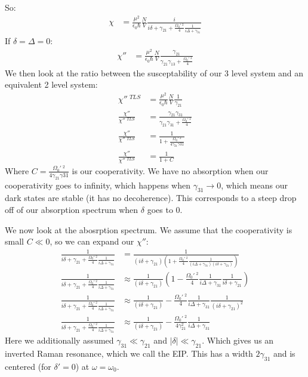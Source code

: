 So:
\begin{align*}
	\chi &= \frac{\mu^2}{\epsilon_0\hbar} \frac{N}{V} \frac{i}{i\delta + \gamma_{21} + \frac{\Omega_0'\ ^2}{4}\frac{1}{i\Delta + \gamma_{31}}}
\end{align*}
If $\delta = \Delta = 0$:
\begin{align*}
	\chi'' &= \frac{\mu^2}{\epsilon_0 \hbar} \frac{N}{V} \frac{\gamma_{21}}{\gamma_{21}\gamma_{13} + \frac{\Omega_0'\ ^2}{4}}
\end{align*}
We then look at the ratio between the susceptability of our 3 level system and an equivalent 2 level system:
\begin{align*}
	\chi''\ ^{TLS} &= \frac{\mu^2}{\epsilon_0\hbar} \frac{N}{V} \frac{1}{\gamma_{21}} \\
	\frac{\chi''}{\chi''\ ^{TLS}} &= \frac{\gamma_{21}\gamma_{31}}{\gamma_{21}\gamma_{31} + \frac{\Omega_0'\ ^2}{4}} \\
	\frac{\chi''}{\chi''\ ^{TLS}} &= \frac{1}{1 + \frac{\Omega_0'\ ^2}{4\gamma_{21}\gamma{31}}} \\
	\frac{\chi''}{\chi''\ ^{TLS}} &= \frac{1}{1 + C}
\end{align*}
Where $C = \frac{\Omega_0'\ ^2}{4\gamma_{21}\gamma{31}}$ is our cooperativity. We have no absorption when our cooperativity goes to infinity, which happens when $\gamma_{31}\to0$, which means our dark states are stable (it has no decoherence).
This corresponds to a steep drop off of our absorption spectrum when $\delta$ goes to $0$.

We now look at the abosrption spectrum. We assume that the cooperativity is small $C\ll 0$, so we can expand our $\chi''$:
\begin{align*}
	\frac{1}{i\delta + \gamma_{21} + \frac{\Omega_0'\ ^2}{4}\frac{1}{i\Delta + \gamma_{31}}} &= \frac{1}{(i\delta + \gamma_{21}) \left( 1+ \frac{\Omega_0'\ ^2}{4}\frac{1}{(i\Delta + \gamma_{31})(i\delta + \gamma_{21})}\right)} \\
	\frac{1}{i\delta + \gamma_{21} + \frac{\Omega_0'\ ^2}{4}\frac{1}{i\Delta + \gamma_{31}}} &\approx \frac{1}{(i\delta + \gamma_{21})}\left( 1 - \frac{\Omega_0'\ ^2}{4} \frac{1}{i\Delta + \gamma_{31}} \frac{1}{i\delta + \gamma_{21}}\right)\\
	\frac{1}{i\delta + \gamma_{21} + \frac{\Omega_0'\ ^2}{4}\frac{1}{i\Delta + \gamma_{31}}} &\approx \frac{1}{(i\delta + \gamma_{21})}- \frac{\Omega_0'\ ^2}{4} \frac{1}{i\Delta + \gamma_{31}} \frac{1}{(i\delta + \gamma_{21})^2} \\
	\frac{1}{i\delta + \gamma_{21} + \frac{\Omega_0'\ ^2}{4}\frac{1}{i\Delta + \gamma_{31}}} &\approx \frac{1}{(i\delta + \gamma_{21})}- \frac{\Omega_0'\ ^2}{4\gamma_{21}^2} \frac{1}{i\Delta + \gamma_{31}}
\end{align*}
Here we additionally assumed $\gamma_{31} \ll \gamma_{21}$ and $|\delta|\ll \gamma_{21}$.
Which gives us an inverted Raman resonance, which we call the EIP. This has a width $2\gamma_{31}$ and is centered (for $\delta'=0$) at $\omega = \omega_0$.

